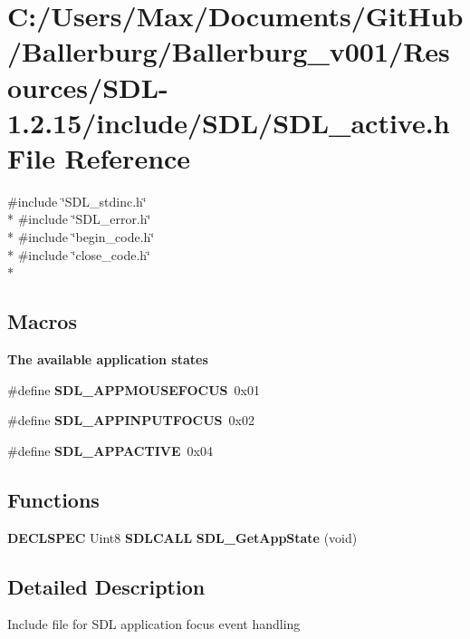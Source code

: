\section{C\+:/\+Users/\+Max/\+Documents/\+Git\+Hub/\+Ballerburg/\+Ballerburg\+\_\+v001/\+Resources/\+S\+D\+L-\/1.2.15/include/\+S\+D\+L/\+S\+D\+L\+\_\+active.h File Reference}
\label{_s_d_l__active_8h}
{\ttfamily \#include \char`\"{}S\+D\+L\+\_\+stdinc.\+h\char`\"{}}\\*
{\ttfamily \#include \char`\"{}S\+D\+L\+\_\+error.\+h\char`\"{}}\\*
{\ttfamily \#include \char`\"{}begin\+\_\+code.\+h\char`\"{}}\\*
{\ttfamily \#include \char`\"{}close\+\_\+code.\+h\char`\"{}}\\*
\subsection*{Macros}
\begin{Indent}{\bf The available application states}\par
\begin{DoxyCompactItemize}
\item 
\#define {\bf S\+D\+L\+\_\+\+A\+P\+P\+M\+O\+U\+S\+E\+F\+O\+C\+U\+S}~0x01
\item 
\#define {\bf S\+D\+L\+\_\+\+A\+P\+P\+I\+N\+P\+U\+T\+F\+O\+C\+U\+S}~0x02
\item 
\#define {\bf S\+D\+L\+\_\+\+A\+P\+P\+A\+C\+T\+I\+V\+E}~0x04
\end{DoxyCompactItemize}
\end{Indent}
\subsection*{Functions}
\begin{DoxyCompactItemize}
\item 
{\bf D\+E\+C\+L\+S\+P\+E\+C} Uint8 {\bf S\+D\+L\+C\+A\+L\+L} {\bf S\+D\+L\+\_\+\+Get\+App\+State} (void)
\end{DoxyCompactItemize}


\subsection{Detailed Description}
Include file for S\+D\+L application focus event handling 

